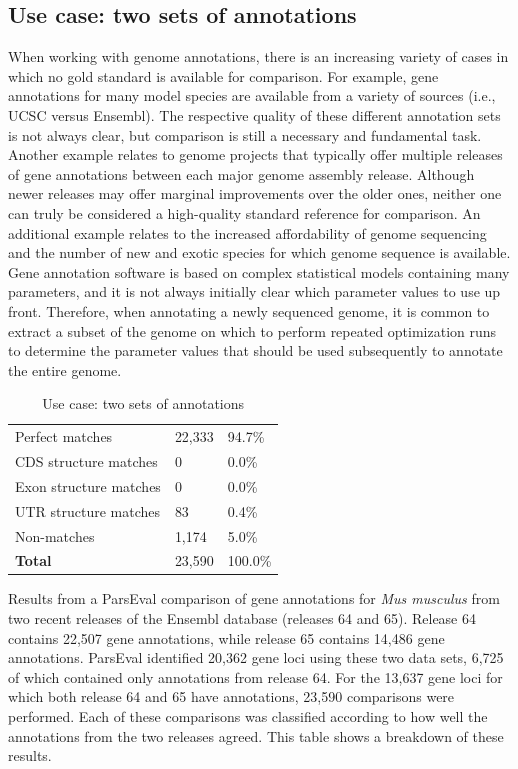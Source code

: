 \subsection{Use case: two sets of annotations}
When working with genome annotations, there is an increasing variety of cases in which no gold standard is available for comparison.
For example, gene annotations for many model species are available from a variety of sources (i.e., UCSC versus Ensembl).
The respective quality of these different annotation sets is not always clear, but comparison is still a necessary and fundamental task.
Another example relates to genome projects that typically offer multiple releases of gene annotations between each major genome assembly release.
Although newer releases may offer marginal improvements over the older ones, neither one can truly be considered a high-quality standard reference for comparison.
An additional example relates to the increased affordability of genome sequencing and the number of new and exotic species for which genome sequence is available.
Gene annotation software is based on complex statistical models containing many parameters, and it is not always initially clear which parameter values to use up front.
Therefore, when annotating a newly sequenced genome, it is common to extract a subset of the genome on which to perform repeated optimization runs to determine the parameter values that should be used subsequently to annotate the entire genome.

\begin{table}
\caption{Use case: two sets of annotations}
\begin{tabularx}{\textwidth}{p{7cm}p{5cm}l}
\hline
  Perfect matches         &  22,333  &  94.7\%  \\
  CDS structure matches   &  0       &  0.0\%   \\
  Exon structure matches  &  0       &  0.0\%   \\
  UTR structure matches   &  83      &  0.4\%   \\
  Non-matches             &  1,174   &  5.0\%   \\ \hline
  \textbf{Total}          &  23,590  & 100.0\%  \\ \hline
\end{tabularx}
\label{Table:UseCaseTwoAnnotations}
\raggedright
{\scriptsize
Results from a ParsEval comparison of gene annotations for
\textit{Mus musculus} from
two recent releases of the Ensembl database (releases 64 and 65). Release 64
contains 22,507 gene annotations, while release 65 contains 14,486 gene
annotations. ParsEval identified 20,362 gene loci using these two data sets, 6,725
of which contained only annotations from release 64. For the 13,637 gene loci
for which both release 64 and 65 have annotations, 23,590 comparisons were
performed. Each of these comparisons was classified according to how well the
annotations from the two releases agreed. This table shows a breakdown of
these results.
}
\end{table}

